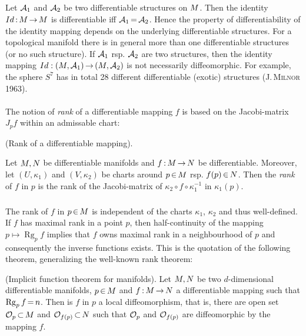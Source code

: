 \documentclass[11pt,twoside]{article}
\begin{document}
\subparagraph{}
Let $\cal{A}_1$ and $\cal{A}_2$ be two differentiable structures on $\difM$.
Then the identity $Id \: \difM \xto \difM$ is differentiable
iff $\cal{A}_1 \eq \cal{A}_2$. 
Hence the property of differentiability of the identity mapping depends
on the underlying differentiable structures.
For a topological manifold there is in general more than one
differentiable structures (or no such structure).
If $\cal{A}_1$ rsp. $\cal{A}_2$ are two structures,
then the identity mapping $Id:(\difM,\cal{A}_1) \xto (\difM,\cal{A}_2)$
is not necessarily diffeomorphic.
For example,
the sphere $S^7$ has in total 28 different differentiable
(exotic) structures (\textsc{J.\,Milnor} 1963).

\paragraph{}
The notion of \textit{rank} of a differentiable mapping $f$ is based
on the Jacobi-matrix $J_p f$ within an admissable chart:


\begin{definition}
(Rank of a differentiable mapping).

Let $\difM,\difN$ be differentiable manifolds
and $f \: \difM \xto \difN$ be differentiable.
Moreover,
let $(U,\kappa_1)$ and $(V,\kappa_2)$ be charts around $p \xeof \difM$ rsp.
$f(p) \xeof \difN$.
Then the \textit{rank} of $f$ in $p$ is the rank
of the Jacobi-matrix of $\kappa_2 \circ f \circ \kappa_1^{-1}$ in $\kappa_1(p)$.
\end{definition}

\subparagraph{}
The rank of $f$ in $p \xeof \difM$ is independent of the charts
$\kappa_1$, $\kappa_2$ and thus well-defined.
If $f$ has maximal rank in a point $p$,
then half-continuity of the mapping $p \mapsto \operatorname{Rg}_p f$ implies
that $f$ owns maximal rank in a neighbourhood of $p$ and consequently
the inverse functions exists.
This is the quotation of the following theorem,
generalizing the well-known rank theorem:

\begin{theorem} (Implicit function theorem for manifolds).
Let $\difM,\difN$ be two $d$-dimensional differentiable manifolds,
$p \xeof \difM$ and $f \: \difM \xto \difN$ a differentiable mapping
such that
$\operatorname{Rg}_p f \eq n$.
Then is $f$ in $p$ a local diffeomorphism,
that is,
there are open set $\Off_p \xsubset \difM$
and $\Off_{f(p)} \xsubset \difN$
such that $\Off_p$ and $\Off_{f(p)}$ are diffeomorphic by the mapping $f$.
\end{theorem}
\end{document}
